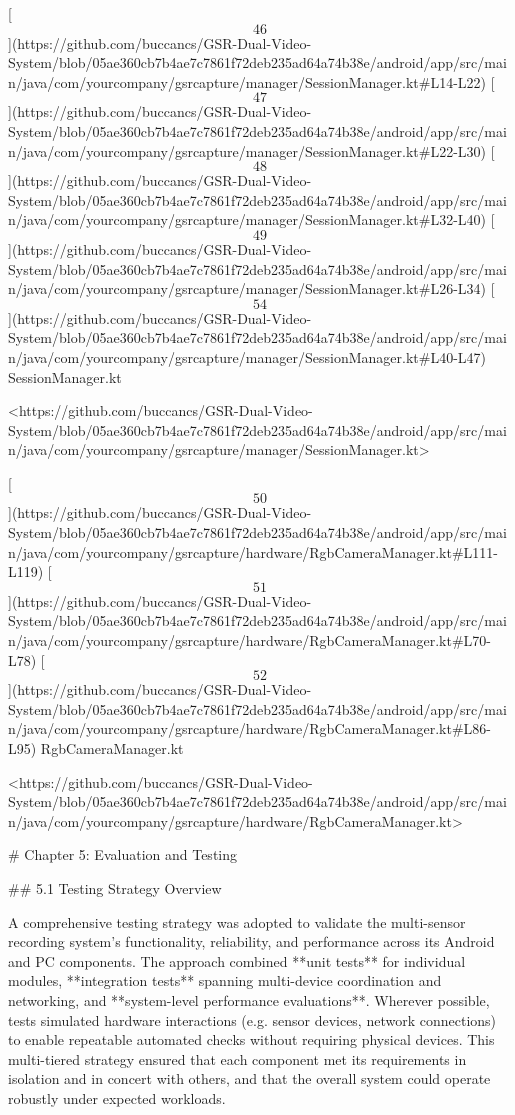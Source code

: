\documentclass[12pt,a4paper]{article}
\begin{document}
{[\[46\]](https://github.com/buccancs/GSR-Dual-Video-System/blob/05ae360cb7b4ae7c7861f72deb235ad64a74b38e/android/app/src/main/java/com/yourcompany/gsrcapture/manager/SessionManager.kt#L14-L22)
[\[47\]](https://github.com/buccancs/GSR-Dual-Video-System/blob/05ae360cb7b4ae7c7861f72deb235ad64a74b38e/android/app/src/main/java/com/yourcompany/gsrcapture/manager/SessionManager.kt#L22-L30)
[\[48\]](https://github.com/buccancs/GSR-Dual-Video-System/blob/05ae360cb7b4ae7c7861f72deb235ad64a74b38e/android/app/src/main/java/com/yourcompany/gsrcapture/manager/SessionManager.kt#L32-L40)
[\[49\]](https://github.com/buccancs/GSR-Dual-Video-System/blob/05ae360cb7b4ae7c7861f72deb235ad64a74b38e/android/app/src/main/java/com/yourcompany/gsrcapture/manager/SessionManager.kt#L26-L34)
[\[54\]](https://github.com/buccancs/GSR-Dual-Video-System/blob/05ae360cb7b4ae7c7861f72deb235ad64a74b38e/android/app/src/main/java/com/yourcompany/gsrcapture/manager/SessionManager.kt#L40-L47)
SessionManager.kt

<https://github.com/buccancs/GSR-Dual-Video-System/blob/05ae360cb7b4ae7c7861f72deb235ad64a74b38e/android/app/src/main/java/com/yourcompany/gsrcapture/manager/SessionManager.kt>

[\[50\]](https://github.com/buccancs/GSR-Dual-Video-System/blob/05ae360cb7b4ae7c7861f72deb235ad64a74b38e/android/app/src/main/java/com/yourcompany/gsrcapture/hardware/RgbCameraManager.kt#L111-L119)
[\[51\]](https://github.com/buccancs/GSR-Dual-Video-System/blob/05ae360cb7b4ae7c7861f72deb235ad64a74b38e/android/app/src/main/java/com/yourcompany/gsrcapture/hardware/RgbCameraManager.kt#L70-L78)
[\[52\]](https://github.com/buccancs/GSR-Dual-Video-System/blob/05ae360cb7b4ae7c7861f72deb235ad64a74b38e/android/app/src/main/java/com/yourcompany/gsrcapture/hardware/RgbCameraManager.kt#L86-L95)
RgbCameraManager.kt

<https://github.com/buccancs/GSR-Dual-Video-System/blob/05ae360cb7b4ae7c7861f72deb235ad64a74b38e/android/app/src/main/java/com/yourcompany/gsrcapture/hardware/RgbCameraManager.kt>


\newpage


# Chapter 5: Evaluation and Testing

## 5.1 Testing Strategy Overview

A comprehensive testing strategy was adopted to validate the
multi-sensor recording system's functionality, reliability, and
performance across its Android and PC components. The approach combined
**unit tests** for individual modules, **integration tests** spanning
multi-device coordination and networking, and **system-level performance
evaluations**. Wherever possible, tests simulated hardware interactions
(e.g. sensor devices, network connections) to enable repeatable
automated checks without requiring physical devices. This multi-tiered
strategy ensured that each component met its requirements in isolation
and in concert with others, and that the overall system could operate
robustly under expected workloads.

}
\end{document}
